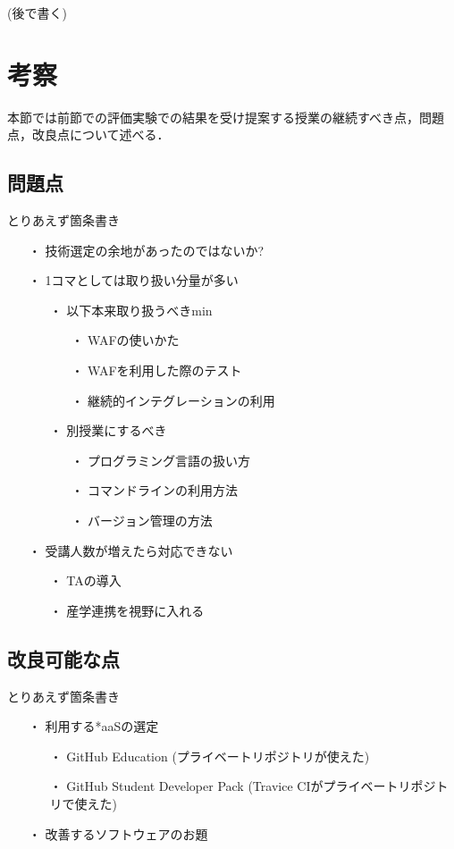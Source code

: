 (後で書く)

\section{考察}

本節では前節での評価実験での結果を受け提案する授業の継続すべき点，問題点，改良点について述べる．

\subsection{問題点}

とりあえず箇条書き

\begin{itemize}
  \item[・] 技術選定の余地があったのではないか?
  \item[・] 1コマとしては取り扱い分量が多い
    \begin{itemize}
    \item[・] 以下本来取り扱うべきmin
      \begin{itemize}
        \item[・] WAFの使いかた
        \item[・] WAFを利用した際のテスト
        \item[・] 継続的インテグレーションの利用
      \end{itemize}
    \item[・] 別授業にするべき
      \begin{itemize}
        \item[・] プログラミング言語の扱い方
        \item[・] コマンドラインの利用方法
        \item[・] バージョン管理の方法
      \end{itemize}
    \end{itemize}
  \item[・] 受講人数が増えたら対応できない
    \begin{itemize}
      \item[・] TAの導入
      \item[・] 産学連携を視野に入れる
    \end{itemize}
\end{itemize}

\subsection{改良可能な点}

とりあえず箇条書き

\begin{itemize}
\item[・] 利用する*aaSの選定
  \begin{itemize}
    \item[・] GitHub Education (プライベートリポジトリが使えた)
    \item[・] GitHub Student Developer Pack (Travice CIがプライベートリポジトリで使えた)
  \end{itemize}
\item[・] 改善するソフトウェアのお題
\end{itemize}
